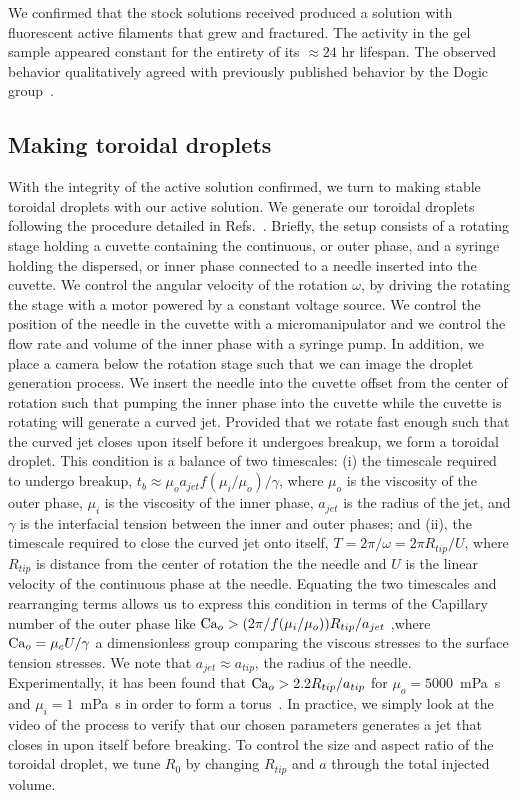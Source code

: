 We confirmed that the stock solutions received produced a solution with fluorescent active filaments that grew and fractured.
The activity in the gel sample appeared constant for the entirety of its  $\approx 24$ hr lifespan.
The observed behavior qualitatively agreed with previously published behavior by the Dogic group~\cite{RN3}.


\subsection{Making toroidal droplets}
With the integrity of the active solution confirmed, we turn to making stable toroidal droplets with our active solution.
We generate our toroidal droplets following the procedure detailed in Refs.~\cite{RN29,RN47,RN257}.
Briefly, the setup consists of a rotating stage holding a cuvette containing the continuous, or outer phase, and a syringe holding the dispersed, or inner phase connected to a needle inserted into the cuvette.
We control the angular velocity of the rotation $\omega$, by driving the rotating the stage with a motor powered by a constant voltage source.
We control the position of the needle in the cuvette with a micromanipulator and we control the flow rate and volume of the inner phase with a syringe pump.
In addition, we place a camera below the rotation stage such that we can image the droplet generation process.
We insert the needle into the cuvette offset from the center of rotation such that pumping the inner phase into the cuvette while the cuvette is rotating will generate a curved jet.
Provided that we rotate fast enough such that the curved jet closes upon itself before it undergoes breakup, we form a toroidal droplet.
This condition is a balance of two timescales: (i) the timescale required to undergo breakup, $t_b \approx \mu_o a_{jet} f(\mu_i/\mu_o)/\gamma$, where $\mu_o$ is the viscosity of the outer phase, $\mu_i$ is the viscosity of the inner phase, $a_{jet}$ is the radius of the jet, and $\gamma$ is the interfacial tension between the inner and outer phases; and (ii), the timescale required to close the curved jet onto itself, $T = 2\pi/\omega = 2 \pi R_{tip}/U$, where $R_{tip}$ is distance from the center of rotation the the needle and $U$ is the linear velocity of the continuous phase at the needle.
Equating the two timescales and rearranging terms allows us to express this condition in terms of the Capillary number of the outer phase like $\textup{Ca}_o > (2 \pi / f(\mu_i/\mu_o))R_{tip}/a_{jet}$ ,where $\textup{Ca}_o = \mu_c U/\gamma$ a dimensionless group comparing the viscous stresses to the surface tension stresses.
We note that $a_{jet} \approx a_{tip}$, the radius of the needle.
Experimentally, it has been found that $\textup{Ca}_o > 2.2 R_{tip}/a_{tip}$ for $\mu_o = 5000$~mPa~s and $\mu_i = 1$~mPa~s in order to form a torus~\cite{RN29}.
In practice, we simply look at the video of the process to verify that our chosen parameters generates a jet that closes in upon itself before breaking.
To control the size and aspect ratio of the toroidal droplet, we tune $R_0$ by changing $R_{tip}$ and $a$ through the total injected volume. \\

